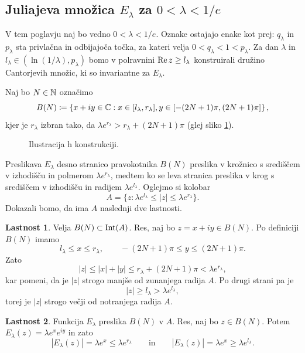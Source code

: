 \subsection{Juliajeva množica \texorpdfstring{\(E_\lambda\)}{E\_\lambda} za \texorpdfstring{\(0 < \lambda < 1/e\)}{0 < \lambda < 1/e}}

V tem poglavju naj bo vedno \(0 < \lambda < 1/e\). Oznake ostajajo enake kot prej: \(q_\lambda\) in \(p_\lambda\) sta privlačna in odbijajoča točka, za kateri velja \(0 < q_\lambda < 1 < p_\lambda\). Za dan \(\lambda\) in \(l_\lambda \in (\ln (1 / \lambda), p_\lambda)\) bomo v polravnini \(\operatorname{Re} z \geq l_\lambda\) konstruirali družino Cantorjevih množic, ki so invariantne za \(E_\lambda\).

Naj bo \(N \in \mathbb N\) označimo
\[B(N) \coloneq \left\{ x + iy \in \mathbb C : x \in [l_\lambda, r_\lambda], y \in [- (2N + 1) \pi, (2N + 1) \pi] \right\},\]
kjer je \(r_\lambda\) izbran tako, da \(\lambda e^{r_\lambda} > r_\lambda + (2N + 1) \pi\) (glej sliko \ref{fig:konstrukcija}).
\begin{figure}%
    \centering
    
    \caption{Ilustracija h konstrukciji.}
    \label{fig:konstrukcija}
\end{figure}
Preslikava \(E_\lambda\) desno stranico pravokotnika \(B (N)\) preslika v krožnico s središčem v izhodišču in polmerom \(\lambda e^{r_\lambda}\), medtem ko se leva stranica preslika v krog s središčem v izhodišču in radijem \(\lambda e^{l_\lambda}\). Oglejmo si kolobar
\[A = \{z : \lambda e^{l_\lambda} \leq |z| \leq \lambda e^{r_\lambda}\}.\]
Dokazali bomo, da ima \(A\) naslednji dve lastnosti.

\vspace{5mm}
\noindent \textbf{Lastnost 1}. Velja \(B (N) \subset \operatorname{Int} (A)\). Res, naj  bo \(z = x + i y \in B (N)\). Po definiciji \(B (N)\) imamo
\[l_\lambda \leq x \leq r_\lambda, \qquad - (2N + 1) \pi \leq y \leq (2N + 1) \pi.\]
Zato
\[|z| \leq |x| + |y| \leq r_\lambda + (2N + 1) \pi < \lambda e^{r_\lambda},\]
kar pomeni, da je \(|z|\) strogo manjše od zunanjega radija \(A\). Po drugi strani pa je
\[|z| \geq l_\lambda > \lambda e^{l_\lambda},\]
torej je \(|z|\) strogo večji od notranjega radija \(A\).

\noindent \textbf{Lastnost 2}. Funkcija \(E_\lambda\) preslika \(B (N)\) v \(A\). Res, naj bo \(z \in B (N)\). Potem \(E_\lambda (z) = \lambda e^x e^{i y}\) in zato
\[|E_\lambda (z)| = \lambda e^x \leq \lambda e^{r_\lambda} \qquad \text{in} \qquad |E_\lambda (z)| = \lambda e^x \geq \lambda e^{l_\lambda}.\]
\vspace{5mm}


